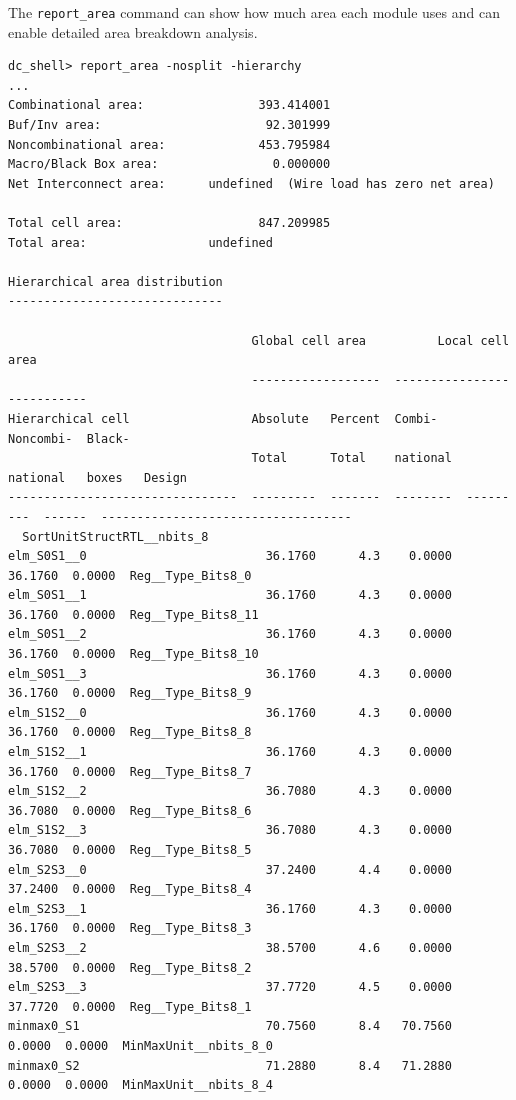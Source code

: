 \documentclass[a4paper,12pt,twoside]{article}
\begin{document}
The \texttt{report\_area} command can show how much area each module uses and can enable detailed area breakdown analysis.
\begin{verbatim}
dc_shell> report_area -nosplit -hierarchy
...
Combinational area:                393.414001
Buf/Inv area:                       92.301999
Noncombinational area:             453.795984
Macro/Black Box area:                0.000000
Net Interconnect area:      undefined  (Wire load has zero net area)

Total cell area:                   847.209985
Total area:                 undefined

Hierarchical area distribution
------------------------------

                                  Global cell area          Local cell area
                                  ------------------  ---------------------------
Hierarchical cell                 Absolute   Percent  Combi-    Noncombi-  Black-
                                  Total      Total    national  national   boxes   Design
--------------------------------  ---------  -------  --------  ---------  ------  -----------------------------------
  SortUnitStructRTL__nbits_8
elm_S0S1__0                         36.1760      4.3    0.0000    36.1760  0.0000  Reg__Type_Bits8_0
elm_S0S1__1                         36.1760      4.3    0.0000    36.1760  0.0000  Reg__Type_Bits8_11
elm_S0S1__2                         36.1760      4.3    0.0000    36.1760  0.0000  Reg__Type_Bits8_10
elm_S0S1__3                         36.1760      4.3    0.0000    36.1760  0.0000  Reg__Type_Bits8_9
elm_S1S2__0                         36.1760      4.3    0.0000    36.1760  0.0000  Reg__Type_Bits8_8
elm_S1S2__1                         36.1760      4.3    0.0000    36.1760  0.0000  Reg__Type_Bits8_7
elm_S1S2__2                         36.7080      4.3    0.0000    36.7080  0.0000  Reg__Type_Bits8_6
elm_S1S2__3                         36.7080      4.3    0.0000    36.7080  0.0000  Reg__Type_Bits8_5
elm_S2S3__0                         37.2400      4.4    0.0000    37.2400  0.0000  Reg__Type_Bits8_4
elm_S2S3__1                         36.1760      4.3    0.0000    36.1760  0.0000  Reg__Type_Bits8_3
elm_S2S3__2                         38.5700      4.6    0.0000    38.5700  0.0000  Reg__Type_Bits8_2
elm_S2S3__3                         37.7720      4.5    0.0000    37.7720  0.0000  Reg__Type_Bits8_1
minmax0_S1                          70.7560      8.4   70.7560     0.0000  0.0000  MinMaxUnit__nbits_8_0
minmax0_S2                          71.2880      8.4   71.2880     0.0000  0.0000  MinMaxUnit__nbits_8_4

\end{verbatim}
\end{document}
